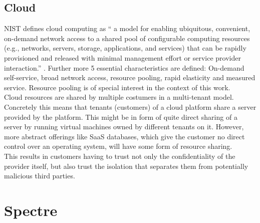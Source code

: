 \documentclass[conference,compsoc,final,a4paper]{IEEEtran}
\begin{document}
\subsection{Cloud}
NIST defines cloud computing as \enquote{\textelp{} a model for enabling ubiquitous, convenient, on-demand network access to a shared pool of configurable computing resources (e.g., networks, servers, storage, applications, and services) that can be rapidly provisioned and released with minimal management effort or service provider interaction.} \textcite{mell2011nist}. Further more 5 essential characteristics are defined: On-demand self-service, broad network access, resource pooling, rapid   elasticity and measured service. Resource pooling is of special interest in the context of this work. \\
Cloud resources are shared by multiple costumers in a multi-tenant model. \cite{mell2011nist} Concretely this means that tenants (customers) of a cloud platform share a server provided by the platform. This might be in form of quite direct sharing of a server by running virtual machines owned by different tenants on it. However, more abstract offerings like \ac{SaaS} databases, which give the customer no direct control over an operating system, will have some form of resource sharing. \\
This results in customers having to trust not only the confidentiality of the provider itself, but also trust the isolation that separates them from potentially malicious third parties.
\section{Spectre}
\end{document}
